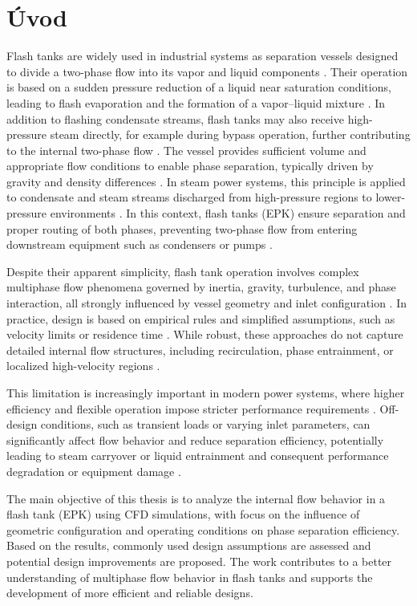 \chapter*{Úvod}\label{chap:uvod}

Flash tanks are widely used in industrial systems as separation vessels designed to divide a two-phase flow into its vapor and liquid components \cite{separation_general}. Their operation is based on a sudden pressure reduction of a liquid near saturation conditions, leading to flash evaporation and the formation of a vapor–liquid mixture \cite{flash_evaporation}. In addition to flashing condensate streams, flash tanks may also receive high-pressure steam directly, for example during bypass operation, further contributing to the internal two-phase flow \cite{epk_design}. The vessel provides sufficient volume and appropriate flow conditions to enable phase separation, typically driven by gravity and density differences \cite{separation_general,flash_evaporation}. In steam power systems, this principle is applied to condensate and steam streams discharged from high-pressure regions to lower-pressure environments \cite{epk_design}. In this context, flash tanks (EPK) ensure separation and proper routing of both phases, preventing two-phase flow from entering downstream equipment such as condensers or pumps \cite{epk_design}.

Despite their apparent simplicity, flash tank operation involves complex multiphase flow phenomena governed by inertia, gravity, turbulence, and phase interaction, all strongly influenced by vessel geometry and inlet configuration \cite{multiphase_fundamentals}. In practice, design is based on empirical rules and simplified assumptions, such as velocity limits or residence time \cite{design_guidelines}. While robust, these approaches do not capture detailed internal flow structures, including recirculation, phase entrainment, or localized high-velocity regions \cite{multiphase_fundamentals,design_guidelines}.

This limitation is increasingly important in modern power systems, where higher efficiency and flexible operation impose stricter performance requirements \cite{modern_power_systems}. Off-design conditions, such as transient loads or varying inlet parameters, can significantly affect flow behavior and reduce separation efficiency, potentially leading to steam carryover or liquid entrainment and consequent performance degradation or equipment damage \cite{modern_power_systems}.

The main objective of this thesis is to analyze the internal flow behavior in a flash tank (EPK) using CFD simulations, with focus on the influence of geometric configuration and operating conditions on phase separation efficiency. Based on the results, commonly used design assumptions are assessed and potential design improvements are proposed. The work contributes to a better understanding of multiphase flow behavior in flash tanks and supports the development of more efficient and reliable designs.